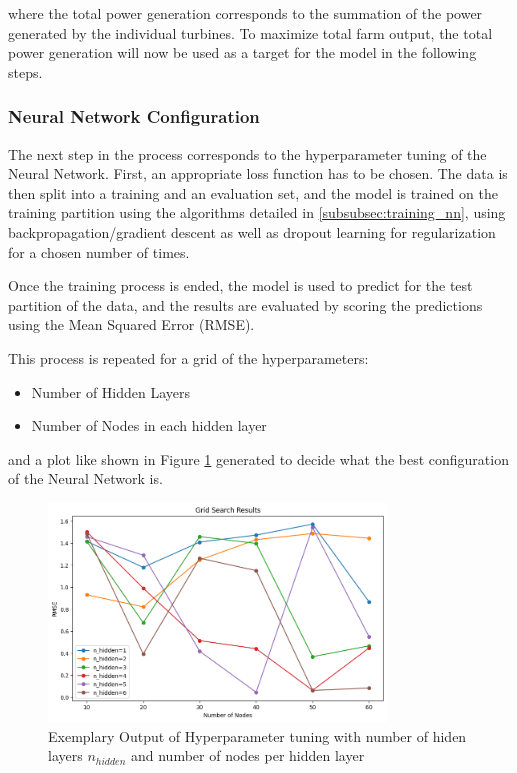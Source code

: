 \documentclass[preprint,12pt]{elsarticle}
\begin{document}
where the total power generation corresponds to the summation of the power generated by the individual turbines. To maximize total farm output, the total power generation will now be used as a target for the model in the following steps.


\subsubsection{Neural Network Configuration}

The next step in the process corresponds to the hyperparameter tuning of the Neural Network. First, an appropriate loss function has to be chosen. The data is then split into a training and an evaluation set, and the model is trained on the training partition using the algorithms detailed in  \ref{subsubsec:training_nn}, using backpropagation/gradient descent as well as dropout learning for regularization for a chosen number of times.  

Once the training process is ended, the model is used to predict for the test partition of the data, and the results are evaluated by scoring the predictions using the Mean Squared Error (RMSE). 

This process is repeated for a grid of the hyperparameters:
\begin{itemize}
	\item Number of Hidden Layers
	\item Number of Nodes in each hidden layer
\end{itemize}

and a plot like shown in Figure	\ref{fig:hyperparm} generated to decide what the best configuration of the Neural Network is. 

\begin{figure}[h] 
	\centering
	\includegraphics[width=0.8\textwidth]{../figures/modelling/hyperparm.png} 
	\caption{Exemplary Output of Hyperparameter tuning with number of hiden layers $n_{hidden} $ and number of nodes per hidden layer}
	\label{fig:hyperparm}
\end{figure}
\end{document}
